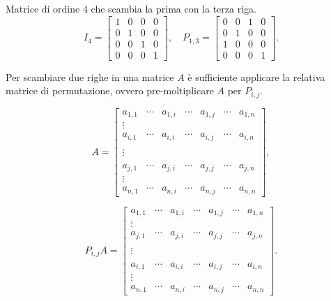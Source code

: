 \begin{exe}Matrice di ordine $4$ che scambia la prima con la terza riga.
\[
I_4 = \left[\begin{array}{cccc}
1       & 0     &   0    &  0  \\
0       & 1     &   0    &  0  \\
0       & 0     & 1      &  0   \\
0       & 0     & 0      &  1
\end{array}\right],
\quad
P_{1,3} =\left[\begin{array}{cccc}
0       & 0     & 1      &  0   \\
0       & 1     &   0    &  0   \\
1       & 0     &   0    &  0   \\
0       & 0     & 0      &  1
\end{array}\right].
\]
\end{exe}

Per scambiare due righe in una matrice $A$ è sufficiente applicare la relativa
matrice di permutazione, ovvero pre-moltiplicare $A$ per $P_{i,j}$.

\[
A = \left[\begin{array}{ccccccc}
a_{1,1} & \cdots & a_{1,i} & \cdots & a_{1,j} & \cdots & a_{1,n} \\
\vdots\\
a_{i,1} & \cdots & a_{i,i} & \cdots & a_{i,j} & \cdots & a_{i,n} \\
\\
\vdots \\
\\
a_{j,1} & \cdots & a_{j,i} & \cdots & a_{j,j} & \cdots & a_{j,n} \\
\vdots\\
a_{n,1} & \cdots & a_{n,i} & \cdots & a_{n,j} & \cdots & a_{n,n}
\end{array}\right],
\]

\[
P_{i,j}A = \left[\begin{array}{ccccccc}
a_{1,1} & \cdots & a_{1,i} & \cdots & a_{1,j} & \cdots & a_{1,n} \\
\vdots\\
a_{j,1} & \cdots & a_{j,i} & \cdots & a_{j,j} & \cdots & a_{j,n} \\
\\
\vdots \\
\\
a_{i,1} & \cdots & a_{i,i} & \cdots & a_{i,j} & \cdots & a_{i,n} \\
\vdots\\
a_{n,1} & \cdots & a_{n,i} & \cdots & a_{n,j} & \cdots & a_{n,n}
\end{array}\right].
\]

